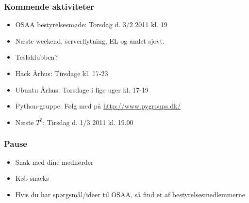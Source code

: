 \documentclass{beamer}
\begin{document}
\begin{frame}
  \frametitle{Kommende aktiviteter}
  \begin{itemize}
  \item OSAA bestyrelsesmøde: Torsdag d. 3/2 2011 kl. 19	 			
  \item Næste weekend, serverflytning, EL og andet sjovt.
  \item Teslaklubben?
  \item Hack Århus: Tirsdage kl. 17-23	       	
  \item Ubuntu Århus: Torsdage i lige uger kl. 17-19 
  \item Python-gruppe: Følg med på \url{http://www.pygroups.dk/}
  \item Næste ${T^3}$: Tirsdag d. 1/3 2011 kl. 19.00
  \end{itemize}						
\end{frame}

\begin{frame}
  \frametitle{Pause}
  \begin{itemize}
  \item Snak med dine mednørder		
  \item Køb snacks 
  \item Hvis du har spørgsmål/ideer til OSAA, så find et af bestyrelsesmedlemmerne
  \end{itemize}	
\end{frame}




%       

\end{document}
